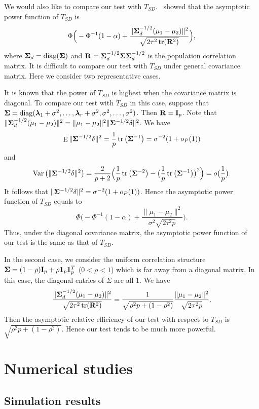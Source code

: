 \documentclass[review]{elsarticle}
\DeclareMathOperator{\mytr}{tr}
\DeclareMathOperator{\mydiag}{diag}
\DeclareMathOperator{\myE}{E}
\DeclareMathOperator{\myVar}{Var}
\newcommand{\bfsym}[1]{\ensuremath{\boldsymbol{#1}}}
\def\blambda {\bfsym {\lambda}}        \def\bLambda {\bfsym {\Lambda}}
\theoremstyle{plain}
\theoremstyle{definition}
\theoremstyle{remark}
\begin{document}
 We would also like to compare our test with $T_{SD}$.~\cite{Srivastava2008A} showed that the asymptotic power function of $T_{SD}$ is
 $$
        \Phi\Big(-\Phi^{-1}(1-\alpha)+\frac{\|\bSigma_d^{-1/2}(\mu_1-\mu_2)\|^2}{\sqrt{2\tau^2\mytr(\BR^2)}}\Big),
 $$
 where $\bSigma_d=\mydiag(\bSigma)$ and $\BR=\bSigma_d^{-1/2} \bSigma \bSigma_d^{-1/2}$ is the population correlation matrix.
 It is difficult to compare our test with $T_{SD}$ under general covariance matrix.
 Here we consider two representative cases.


 It is known that the power of $T_{SD}$ is highest when the covariance matrix is diagonal.
 To compare our test with $T_{SD}$ in this case,
suppose that $\bSigma=\mydiag(\blambda_1+\sigma^2,\ldots,\blambda_r+\sigma^2,\sigma^2,\ldots,\sigma^2)$. Then $\mathbf{R}=\mathbf{I}_p$.
 Note that $\|\bSigma_d^{-1/2}(\mu_1-\mu_2)\|^2=\|\mu_1-\mu_2\|^2 \|\bSigma^{-1/2}\delta\|^2$.
 We have 
 $$\myE\|\bSigma^{-1/2}\delta\|^2=
 \frac{1}{p}\mytr\big(\bSigma^{-1}\big)
 =\sigma^{-2} (1+o_P(1))
 $$
and
 $$
 \myVar\big( \|\bSigma^{-1/2}\delta\|^2 \big)=\frac{2}{p+2}\Big(\frac{1}{p}\mytr\big(\bSigma^{-2}\big)-\big(\frac{1}{p}\mytr\big(\bSigma^{-1}\big)\big)^2\Big)=o\big(\frac{1}{p}\big).$$
It follows that $\|\bSigma^{-1/2}\delta\|^2=\sigma^{-2}(1+o_P(1))$. Hence the asymptotic power function of $T_{SD}$ equals to
 $$
        \Phi\Big(-\Phi^{-1}(1-\alpha)+\frac{\|\mu_1-\mu_2\|^2}{\sigma^2\sqrt{2\tau^2 p}}\Big).
 $$
 Thus, under the diagonal covariance matrix, the asymptotic power function of our test is the same as that of $T_{SD}$.

In the second case, we consider the uniform correlation structure $\bSigma=(1-\rho)\BI_p+\rho \mathbf{1}_p\mathbf{1}_p^T$ ($0<\rho <1$) which is far away from a diagonal matrix.
 In this case, the diagonal entries of $\Sigma$ are all $1$. 
 We have
 $$
 \frac{\|\bSigma_d^{-1/2}(\mu_1-\mu_2)\|^2}{\sqrt{2\tau^2\mytr(\BR^2)}}
 =
 \frac{1}{\sqrt{\rho^2 p +(1-\rho^2)}}\frac{\|\mu_1-\mu_2\|^2}{\sqrt{2\tau^2p}}.
 $$
 Then the asymptotic relative efficiency of our test with respect to $T_{SD}$ is
 $\sqrt{\rho^2 p +(1-\rho^2)}$.
 Hence our test tends to be much more powerful.






\section{Numerical studies}
\subsection{Simulation results}
\end{document}
